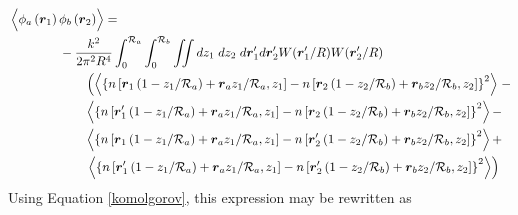 \begin{equation}\label{prphase_n2}
\begin{aligned}
& \left\langle \vphantom{\hat{\phi}_{a}} \phi_{a}\left(\boldsymbol{r}_{1}\right) \phi_{b}\left(\boldsymbol{r}_{2}\right)\right\rangle = \\
&\quad\quad\quad\quad
-\frac{k^{2}}{2\pi^{2}R^{4}} \int_{0}^{\mathcal{R}_{a}}  \int_{0}^{\mathcal{R}_{b}} \iint dz_{1} \; dz_{2} \; d\boldsymbol{r}^{\prime}_{1}d\boldsymbol{r}^{\prime}_{2}  W(\boldsymbol{r}^{\prime}_{1}/R) W(\boldsymbol{r}^{\prime}_{2}/R)\\
&\quad\quad\quad\quad\quad\quad
\left(
\left\langle \left\{n\left[\boldsymbol{r}_{1}\left(1-z_{1}/\mathcal{R}_{a}\right) + \boldsymbol{r}_{a} z_{1}/\mathcal{R}_{a}, z_{1}\right] - 
 n\left[\boldsymbol{r}_{2}\left(1-z_{2}/\mathcal{R}_{b}\right) + \boldsymbol{r}_{b} z_{2}/\mathcal{R}_{b}, z_{2}\right] \right\}^{2} \right\rangle\right. - \\
&\quad\quad\quad\quad\quad\quad
\left\langle \left\{n\left[\boldsymbol{r}^{\prime}_{1}\left(1-z_{1}/\mathcal{R}_{a}\right) + \boldsymbol{r}_{a} z_{1}/\mathcal{R}_{a}, z_{1}\right] - 
 n\left[\boldsymbol{r}_{2}\left(1-z_{2}/\mathcal{R}_{b}\right) + \boldsymbol{r}_{b} z_{2}/\mathcal{R}_{b}, z_{2}\right] \right\}^{2} \right\rangle - \\
&\quad\quad\quad\quad\quad\quad
\left\langle \left\{n\left[\boldsymbol{r}_{1}\left(1-z_{1}/\mathcal{R}_{a}\right) + \boldsymbol{r}_{a} z_{1}/\mathcal{R}_{a}, z_{1}\right] - 
 n\left[\boldsymbol{r}^{\prime}_{2}\left(1-z_{2}/\mathcal{R}_{b}\right) + \boldsymbol{r}_{b} z_{2}/\mathcal{R}_{b}, z_{2}\right] \right\}^{2} \right\rangle + \\
&\quad\quad\quad\quad\quad\quad
\left.
\left\langle \left\{n\left[\boldsymbol{r}^{\prime}_{1}\left(1-z_{1}/\mathcal{R}_{a}\right) + \boldsymbol{r}_{a} z_{1}/\mathcal{R}_{a}, z_{1}\right] - 
 n\left[\boldsymbol{r}^{\prime}_{2}\left(1-z_{2}/\mathcal{R}_{b}\right) + \boldsymbol{r}_{b} z_{2}/\mathcal{R}_{b}, z_{2}\right] \right\}^{2} \right\rangle\right) \\
\end{aligned}
\end{equation}
Using Equation \ref{komolgorov}, this expression may be rewritten as
